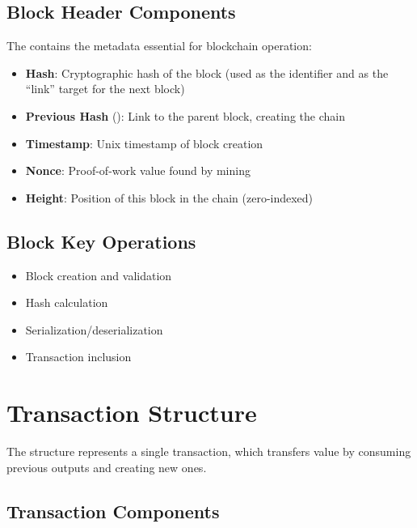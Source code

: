 \subsection{Block Header Components}
\label{sec:ch06-block-header}

The  contains the metadata essential for blockchain operation:

\begin{itemize}
  \item \textbf{Hash}: Cryptographic hash of the block (used as the identifier and as the ``link'' target for the next block)
  \item \textbf{Previous Hash} (): Link to the parent block, creating the chain
  \item \textbf{Timestamp}: Unix timestamp of block creation
  \item \textbf{Nonce}: Proof-of-work value found by mining
  \item \textbf{Height}: Position of this block in the chain (zero-indexed)
\end{itemize}

\subsection{Block Key Operations}
\label{sec:ch06-block-operations}

\begin{itemize}
  \item Block creation and validation
  \item Hash calculation
  \item Serialization/deserialization
  \item Transaction inclusion
\end{itemize}

\section{Transaction Structure}
\label{sec:ch06-transaction-structure}

The  structure represents a single transaction, which transfers value by consuming previous outputs and creating new ones.

\subsection{Transaction Components}
\label{sec:ch06-transaction-components}

